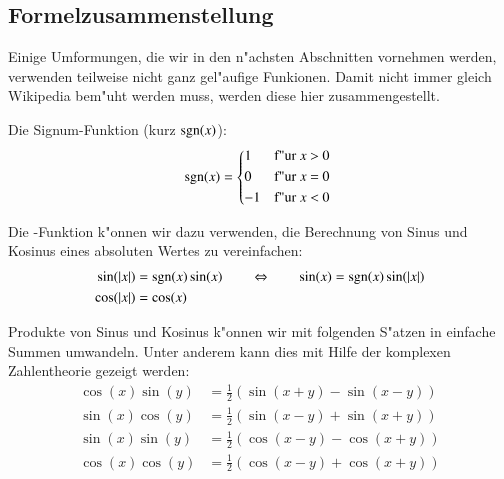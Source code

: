 \subsection{Formelzusammenstellung}
Einige Umformungen, die wir in den n"achsten Abschnitten vornehmen werden, 
verwenden teilweise nicht ganz gel"aufige Funkionen. Damit nicht immer gleich 
Wikipedia bem"uht werden muss, werden diese hier zusammengestellt.

Die Signum-Funktion (kurz $\sgn(x)$):
\begin{equation}
\sgn(x) =
\begin{cases*}
1 & f"ur $x$ > 0 \\
0 & f"ur $x$ = 0 \\
-1 & f"ur $x$ < 0
\end{cases*}
\label{equation:lorenz2:signum}
\end{equation}

Die \sgn-Funktion k"onnen wir dazu verwenden, die Berechnung von Sinus und 
Kosinus eines absoluten Wertes zu vereinfachen:
\begin{equation}
\begin{split}
\sin(|x|) &= \sgn(x)\sin(x) \qquad \Leftrightarrow \qquad \sin(x) = 
\sgn(x)\sin(|x|)
\\
\cos(|x|) &= \cos(x)
\end{split}
\label{equation:lorenz2:sincosabs}
\end{equation}

Produkte von Sinus und Kosinus k"onnen wir mit folgenden S"atzen in einfache 
Summen umwandeln. Unter anderem kann dies mit Hilfe der komplexen 
Zahlentheorie gezeigt werden:
\begin{align*}
\cos(x)\sin(y) &= \frac{1}{2} \left(\sin(x + y) - \sin(x - y)\right)
\\
\sin(x)\cos(y) &= \frac{1}{2} \left(\sin(x - y) + \sin(x + y)\right)
\\
\sin(x)\sin(y) &= \frac{1}{2} \left(\cos(x - y) - \cos(x + y)\right)
\\
\cos(x)\cos(y) &= \frac{1}{2} \left(\cos(x - y) + \cos(x + y)\right)
\end{align*}
